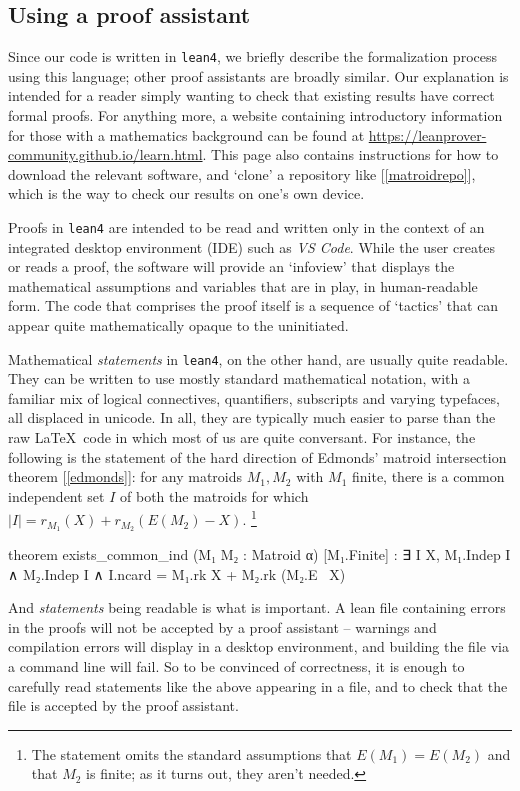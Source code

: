 \documentclass{amsart}
\theoremstyle{plain}
\theoremstyle{definition}
\newcommand{\smalltt}[1]{{\small\texttt{#1}}}
\begin{document}
\subsection*{Using a proof assistant}
Since our code is written in \texttt{lean4}, we briefly describe the formalization process
using this language; other proof assistants are broadly similar. 
Our explanation is intended for a reader simply wanting to check that existing
results have correct formal proofs. For anything more, 
a website containing introductory information for those with a mathematics 
background can be found at {\small\url{https://leanprover-community.github.io/learn.html}}. This page also contains instructions for how to download the relevant
software, and `clone' a repository like [\ref{matroidrepo}], which
is the way to check our results on one's own device. 

Proofs in \smalltt{lean4} are intended to be read and written only in the context
of an integrated desktop environment (IDE) such as \textit{VS Code}. 
While the user creates or reads a proof, 
the software will provide an `infoview' that displays 
the mathematical assumptions and variables that are in play,
in human-readable form. 
The code that comprises the proof itself is a sequence of `tactics'
that can appear quite mathematically opaque to the uninitiated.

Mathematical \emph{statements} in \texttt{lean4}, on the other hand, are usually quite 
readable. They can be written to use mostly standard mathematical notation, 
with a familiar mix of logical connectives, quantifiers, subscripts 
and varying typefaces, all displaced in unicode. In all, they 
are typically much easier to parse than the raw \LaTeX \ code in which 
most of us are quite conversant. For instance, the following is the statement 
of the hard direction of Edmonds' matroid intersection theorem [\ref{edmonds}]:
for any matroids $M_1, M_2$ with $M_1$ finite, there is a common independent 
set $I$ of both the matroids for which $|I| = r_{M_1}(X) + r_{M_2}(E(M_2)-X)$. 
\footnote{The statement omits the standard assumptions that 
$E(M_1) = E(M_2)$ and that $M_2$ is finite; as it turns out, they aren't needed.}

\begin{leancode}
  theorem exists_common_ind (M₁ M₂ : Matroid α) [M₁.Finite] :
    ∃ I X, M₁.Indep I ∧ M₂.Indep I ∧ I.ncard = M₁.rk X + M₂.rk (M₂.E \ X)
\end{leancode}

And \emph{statements} being readable is what is important. A lean file containing errors
in the proofs will not be accepted by a proof assistant 
-- warnings and compilation errors will display in a desktop environment, 
and building the file via a command line will fail. So to be convinced of
correctness, it is enough to carefully read statements like the above appearing in 
a file, and to check that the file is accepted by the proof assistant. 
\end{document}
